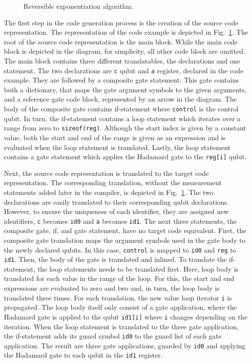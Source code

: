 \begin{figure}
\begin{minipage}{.45\textwidth}
        \caption{Reversible exponentiation algorithm.}    
        \label{fig:implementation_targetCodeRep_example}
    \end{minipage}
\end{figure}

The first step in the code generation process is the creation of the source code representation. The representation of the code example is depicted in Fig.~\ref{fig:implementation_targetCodeRep_example}. The root of the source code representation is the main block. While the main code block is depicted in the diagram, for simplicity, all other code block are omitted. The main block contains three different translatables, the declarations and one statement. The two declarations are \texttt{c} qubit and \texttt{a} register, declared in the code example. They are followed by a composite gate statement. This gate contains both a dictionary, that maps the gate argument symbols to the given arguments, and a reference gate code block, represented by an arrow in the diagram. The body of the composite gate contains if-statement where \texttt{control} is the control qubit. In turn, the if-statement contains a loop statement which iterates over a range from zero to \texttt{sizeof(reg)}. Although the start index is given by a constant value, both the start and end of the range is given as an expression and is evaluated when the loop statement is translated. Lastly, the loop statement contains a gate statement which applies the Hadamard gate to the \texttt{reg[i]} qubit.

Next, the source code representation is translated to the target code representation. The corresponding translation, without the measurement statements added later in the compiler, is depicted in Fig.~\ref{fig:implementation_targetCodeRep_example}. The two declarations are easily translated to their corresponding qubit declarations. However, to ensure the uniqueness of each identifier, they are assigned new identifiers, \texttt{c} becomes \texttt{id0} and \texttt{a} becomes \texttt{id1}. The next three statements, the composite gate, if, and gate statement, have no target code equivalent. First, the composite gate translation maps the argument symbols used in the gate body to the newly declared qubits. In this case, \texttt{control} is mapped to \texttt{id0} and \texttt{reg} to \texttt{id1}. Then, the body of the gate is translated and inlined. To translate the if-statement, the loop statements needs to be translated first. Here, loop body is translated for each value in the range of the loop. For this, the start and end expressions are evaluated to zero and two and, in turn, the loop body is translated three times. For each translation, the new value loop iterator \texttt{i} is propagated. The loop body itself only consist of a gate application, where the Hadamard gate is applied to the qubit \texttt{id1[i]} where \texttt{i} changes depending on the iteration. When the loop statement is translated to the three gate application, the if-statement adds its guard symbol \texttt{id0} to the guard list of each gate application. The result are three gate applications, guarded by \texttt{id0} and applying the Hadamard gate to each qubit in the \texttt{id1} register.

